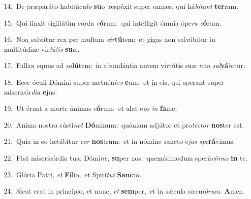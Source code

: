 {\numbfont\textcolor{\numbcolor}{14.}}~De præparáto habitácu\textit{lo} \textbf{su}\-o~\star respéxit super omnes, qui há\-\textit{bi}\-\textit{tant} \textbf{ter}\-ram.\par
{\numbfont\textcolor{\numbcolor}{15.}}~Qui finxit sigillátim corda \textit{e}\-\textbf{ó}rum:~\star qui intélligit ómnia ópe\textit{ra} \textit{e}\-\textbf{ó}rum.\par
{\numbfont\textcolor{\numbcolor}{16.}}~Non salvátur rex per multam \textit{vir}\-\textbf{tú}tem:~\star et gigas non salvábitur in multitúdine vir\-\textit{tú}\-\textit{tis} \textbf{su}\-æ.\par
{\numbfont\textcolor{\numbcolor}{17.}}~Fallax equus ad \textit{sa}\-\textbf{lú}tem:~\star in abundántia autem virtútis suæ \textit{non} \textit{sal}\-\textbf{vá}bitur.\par
{\numbfont\textcolor{\numbcolor}{18.}}~Ecce óculi Dómini super metuén\textit{tes} \textbf{e}\-um:~\star et in eis, qui sperant super misericór\-\textit{di}\-\textit{a} \textbf{e}\-jus:\par
{\numbfont\textcolor{\numbcolor}{19.}}~Ut éruat a morte ánimas \textit{e}\-\textbf{ó}rum:~\star et alat e\textit{os} \textit{in} \textbf{fa}\-me.\par
{\numbfont\textcolor{\numbcolor}{20.}}~Anima nostra sústi\textit{net} \textbf{Dó}\-minum:~\star quóniam adjútor et pro\-\textit{téc}\-\textit{tor} \textbf{nos}\-ter est.\par
{\numbfont\textcolor{\numbcolor}{21.}}~Quia in eo lætábitur \textit{cor} \textbf{nos}\-trum:~\star et in nómine sancto e\textit{jus} \textit{spe}\-\textbf{rá}vimus.\par
{\numbfont\textcolor{\numbcolor}{22.}}~Fiat misericórdia tua, Dómi\-\textit{ne}\-, \textbf{su}\-per nos:~\star quemádmodum sperá\-\textit{vi}\-\textit{mus} \textbf{in} te.\par
{\numbfont\textcolor{\numbcolor}{23.}}~Glória Patri, \textit{et} \textbf{Fí}\-lio,~\star et Spirí\-\textit{tu}\-\textit{i} \textbf{Sanc}\-to.\par
{\numbfont\textcolor{\numbcolor}{24.}}~Sicut erat in princípio, et nunc, \textit{et} \textbf{sem}\-per,~\star et in sǽcula sæcu\-\textit{ló}\-\textit{rum}. \textbf{A}\-men.\par
